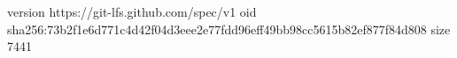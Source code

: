 version https://git-lfs.github.com/spec/v1
oid sha256:73b2f1e6d771c4d42f04d3eee2e77fdd96eff49bb98cc5615b82ef877f84d808
size 7441
